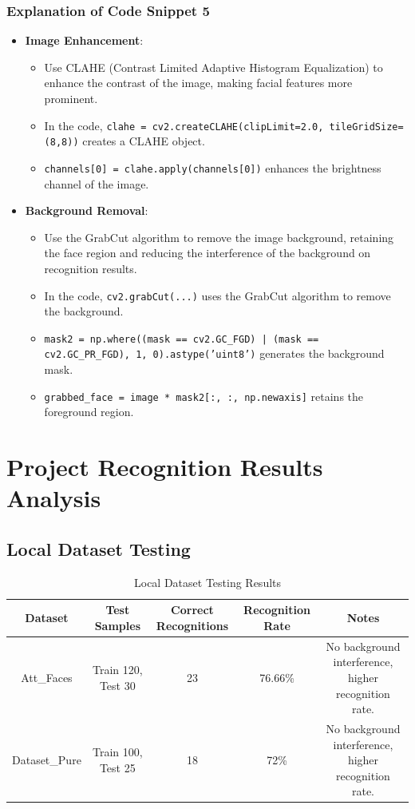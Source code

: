 \documentclass{article}
\begin{document}
\subsubsection{Explanation of Code Snippet 5}
\begin{itemize}
    \item \textbf{Image Enhancement}:
    \begin{itemize}
        \item Use CLAHE (Contrast Limited Adaptive Histogram Equalization) to enhance the contrast of the image, making facial features more prominent.
        \item In the code, \texttt{clahe = cv2.createCLAHE(clipLimit=2.0, tileGridSize=(8,8))} creates a CLAHE object.
        \item \texttt{channels[0] = clahe.apply(channels[0])} enhances the brightness channel of the image.
    \end{itemize}
    \item \textbf{Background Removal}:
    \begin{itemize}
        \item Use the GrabCut algorithm to remove the image background, retaining the face region and reducing the interference of the background on recognition results.
        \item In the code, \texttt{cv2.grabCut(...)} uses the GrabCut algorithm to remove the background.
        \item \texttt{mask2 = np.where((mask == cv2.GC\_FGD) | (mask == cv2.GC\_PR\_FGD), 1, 0).astype('uint8')} generates the background mask.
        \item \texttt{grabbed\_face = image * mask2[:, :, np.newaxis]} retains the foreground region.
    \end{itemize}
\end{itemize}
\newpage
\section{Project Recognition Results Analysis}

\subsection{Local Dataset Testing}

\begin{table}[H]
    \centering
    \begin{tabular}{|c|c|c|c|c|}
        \hline
        Dataset & Test Samples & Correct Recognitions & Recognition Rate & Notes \\
        \hline
        Att\_Faces & Train 120, Test 30 & 23 & 76.66\% & No background interference, higher recognition rate. \\
        \hline
        Dataset\_Pure & Train 100, Test 25 & 18 & 72\% & No background interference, higher recognition rate. \\
        \hline
    \end{tabular}
    \caption{Local Dataset Testing Results}
\end{table}
\end{document}
